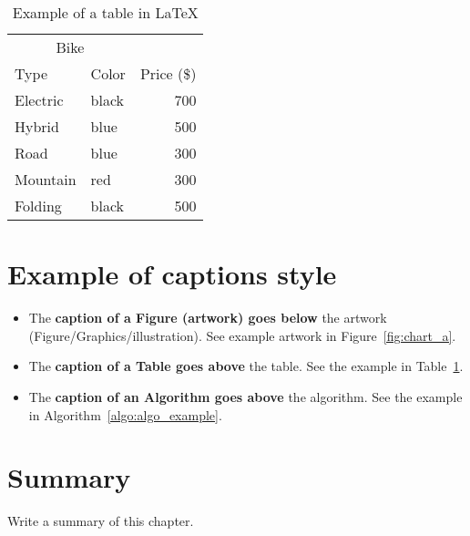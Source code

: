 \begin{table}[h!]
    \centering
    \caption{Example of a table in \LaTeX}
    \label{tab:_ex_tab}
    \begin{tabular}{llr}     
        \toprule
        \multicolumn{2}{c}{Bike} \\
        \cmidrule(r){1-2}
        Type    &  Color & Price (\$) \\
        \midrule
        Electric    & black   & 700   \\
        Hybrid      & blue    & 500   \\
        Road        & blue    & 300   \\
        Mountain    & red     & 300   \\
        Folding     & black   & 500   \\
        \bottomrule
    \end{tabular}
\end{table}

\section{Example of captions style}

\begin{itemize}
    \item The \textbf{caption of a Figure (artwork) goes below} the artwork (Figure/Graphics/illustration). See example artwork in Figure~\ref{fig:chart_a}. 
    \item  The \textbf{caption of a Table goes above} the table. See the example in Table~\ref{tab:_ex_tab}.
    \item  The \textbf{caption of an Algorithm goes above} the algorithm. See the example in Algorithm~\ref{algo:algo_example}.
\end{itemize} 





\section{Summary}
Write a summary of this chapter.



